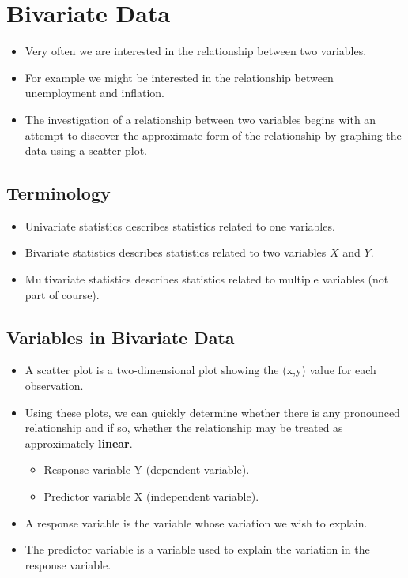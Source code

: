 \documentclass[]{report}
\begin{document}


\section{Bivariate Data}
\begin{itemize}
	\item Very often we are interested in the relationship between two
	variables.
	\item For example we might be interested in the relationship between
	unemployment and inflation.
	\item The investigation of a relationship between two variables
	begins with an attempt to discover the approximate form of the
	relationship by graphing the data using a scatter plot.
\end{itemize}	
\subsection*{Terminology}
\begin{itemize}
	\item Univariate statistics describes statistics related to one variables.
	\item Bivariate statistics describes statistics related to two variables $X$ and $Y$.
	\item Multivariate statistics describes statistics related to multiple variables (not part of course).
\end{itemize}




\subsection*{Variables in Bivariate Data}
\begin{itemize}
	\item  A scatter plot is a two-dimensional plot showing the (x,y) value for each
	observation.
	
	\item  Using these plots, we can quickly determine whether there is
	any pronounced relationship and if so, whether the relationship may be
	treated as approximately \textbf{linear}.\\
	\begin{itemize}
		\item Response variable Y (dependent variable).\\
		\item Predictor variable X (independent variable).
	\end{itemize}
	\item A response variable is the variable whose variation we wish to explain.
	\item The predictor variable is a variable used to explain the variation in the
	response variable.
\end{itemize}
\end{document}
